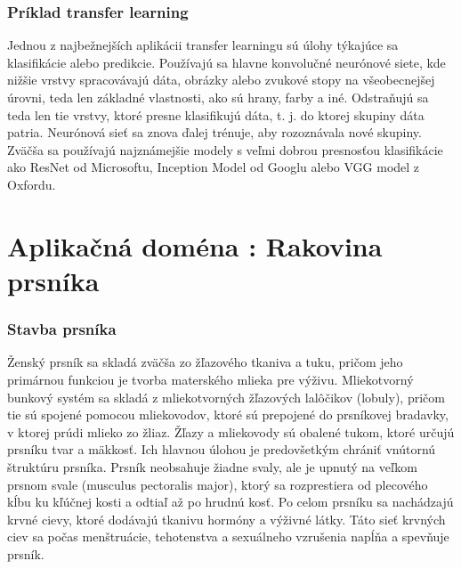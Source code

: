\subsubsection{Príklad transfer learning}
\hspace{10mm}Jednou z najbežnejších aplikácii transfer learningu sú úlohy týkajúce sa klasifikácie alebo predikcie. Používajú sa hlavne konvolučné neurónové siete, kde nižšie vrstvy spracovávajú dáta, obrázky alebo zvukové stopy na všeobecnejšej úrovni, teda len základné vlastnosti,  ako sú hrany, farby a iné. Odstraňujú sa teda len tie vrstvy, ktoré presne klasifikujú dáta, t. j. do ktorej skupiny dáta patria. Neurónová sieť sa znova ďalej trénuje, aby rozoznávala nové skupiny. Zväčša sa používajú najznámejšie modely s veľmi dobrou presnosťou klasifikácie ako ResNet od Microsoftu, Inception Model od Googlu alebo VGG model z Oxfordu. \cite{What-is-Transfer-Learning-nvidia}

\section{Aplikačná doména : Rakovina prsníka}

\subsubsection{Stavba prsníka}
\hspace{10mm}Ženský prsník sa skladá zväčša zo žľazového tkaniva a tuku, pričom jeho primárnou funkciou je tvorba materského mlieka pre výživu. Mliekotvorný bunkový systém sa skladá z mliekotvorných žľazových lalôčikov (lobuly), pričom tie sú spojené pomocou mliekovodov, ktoré sú prepojené do prsníkovej bradavky, v ktorej prúdi mlieko zo žliaz. Žľazy a mliekovody sú obalené tukom, ktoré určujú prsníku tvar a mäkkosť. Ich hlavnou úlohou je predovšetkým chrániť vnútornú štruktúru prsníka. Prsník neobsahuje žiadne svaly, ale je upnutý na veľkom prsnom svale (musculus pectoralis major), ktorý sa rozprestiera od plecového kĺbu ku kľúčnej kosti a odtiaľ až po hrudnú kosť. Po celom prsníku sa nachádzajú krvné cievy, ktoré dodávajú tkanivu hormóny a výživné látky. Táto sieť krvných ciev sa počas menštruácie, tehotenstva a sexuálneho vzrušenia napĺňa a spevňuje prsník. 

